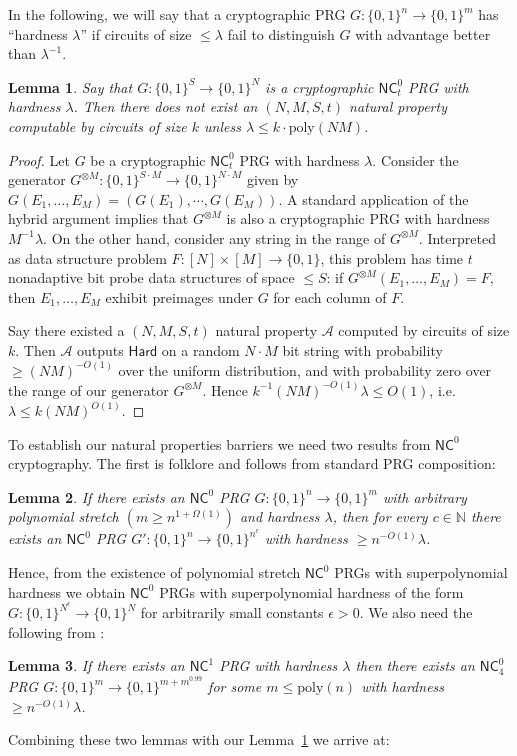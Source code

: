 \documentclass[11pt]{article}
\newtheorem{lemma}{Lemma}
\newcommand{\B}{\{0,1\}}
\newcommand{\poly}{\mathrm{poly}}
\begin{document}
In the following, we will say that a cryptographic PRG $G: \B^n \to \B^m$ has ``hardness $\lambda$'' if circuits of size $\leq \lambda$ fail to distinguish $G$ with advantage better than $\lambda^{-1}$. 
\begin{lemma}\label{lem:hybrid-natural-prop}
Say that $G: \B^S \to \B^N$ is a cryptographic $\mathsf{NC}^0_t$ PRG with hardness $\lambda$. Then there does not exist an $(N,M,S,t)$ natural property computable by circuits of size $k$ unless $\lambda \leq k \cdot \poly(NM) $.
\end{lemma}
\begin{proof}
Let $G$ be  a cryptographic $\mathsf{NC}^0_t$ PRG with hardness $\lambda$. Consider the generator $G^{\otimes M}: \B^{S\cdot M} \to \B^{N \cdot M}$ given by $G(E_1,\ldots,E_M) = (G(E_1),\cdots, G(E_M))$. A standard application of the hybrid argument implies that $G^{\otimes M}$ is also a cryptographic PRG with hardness $M^{-1}\lambda$. On the other hand, consider any string in the range of $G^{\otimes M}$. Interpreted as data structure problem $F:[N] \times [M] \to \B$, this problem has time $t$ nonadaptive bit probe data structures of space $\leq S$: if $G^{\otimes M}(E_1,\ldots,E_M)= F$, then $E_1,\ldots,E_M$ exhibit preimages under $G$ for each column of $F$.

Say there existed a $(N,M,S,t)$ natural property $\mathcal{A}$ computed by circuits of size $k$. Then $\mathcal{A}$ outputs $\mathsf{Hard}$ on a random $N\cdot M$ bit string with probability $\geq (NM)^{-O(1)}$ over the uniform distribution, and with probability zero over the range of our generator $G^{\otimes M}$. Hence $k^{-1}(NM)^{-O(1)} \lambda \leq O(1)$, i.e. $\lambda \leq k(NM)^{O(1)}$.
\end{proof}
To establish our natural properties barriers we need two results from $\mathsf{NC}^0$ cryptography. The first is folklore and follows from standard PRG composition:
\begin{lemma}
If there exists an $\mathsf{NC}^0$ PRG $G: \B^n \to \B^{m}$ with arbitrary polynomial stretch $(m \geq n^{1 + \Omega(1)})$ and hardness $\lambda$, then for every $c \in \mathbb{N}$ there exists an $\mathsf{NC}^0$ PRG $G': \B^n \to \B^{n^c}$ with hardness $ \geq n^{-O(1)}\lambda$.
\end{lemma}
Hence, from the existence of polynomial stretch $\mathsf{NC}^0$ PRGs with superpolynomial hardness we obtain $\mathsf{NC}^0$ PRGs with superpolynomial hardness of the form $G: \B^{N^\epsilon} \to \B^N$ for arbitrarily small constants $\epsilon>0$. 
We also need the following from \cite{randomized-encodings}:
\begin{lemma}
If there exists an $\mathsf{NC}^1$ PRG with hardness $\lambda$ then there exists an $\mathsf{NC}_4^0$ PRG $G: \B^m \to \B^{m + m^{0.99}}$ for some $m \leq \poly(n)$ with hardness $\geq n^{-O(1)}\lambda$.
\end{lemma}
Combining these two lemmas with our Lemma~\ref{lem:hybrid-natural-prop} we arrive at:
\end{document}

